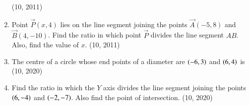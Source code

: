 \begin{enumerate}[label=\thesubsection.\arabic*,ref=\thesubsection.\theenumi]
\hfill (10, 2011)
\item Point $\vec{P}(x, 4)$ lies on the line segment joining the points $\vec{A} (-5,8)$ and $\vec{B} (4, -10)$. Find the ratio in which point $\vec{P}$ divides the line segment $AB$. Also, find the value of $x$.
\hfill (10, 2011)
\item The centre of a circle whose end points of a diameter are $\left(-6,3\right)$ and $\left(6,4\right)$ is
	\\
\hfill (10, 2020)
\item Find the ratio in which the $Y$ axis divides the line segment joining the points $\left(6,-4\right)$ and $\left(-2, -7\right)$. Also find the point of intersection.
\hfill (10, 2020)
\end{enumerate}
